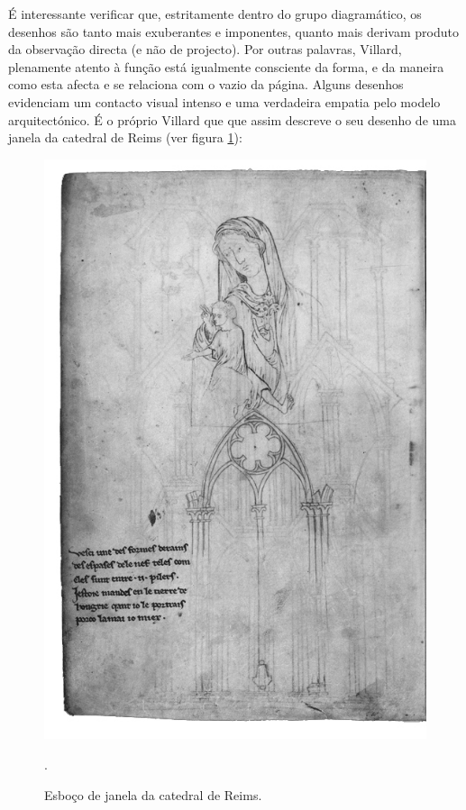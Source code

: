 \documentclass{article}
\begin{document}
É interessante verificar que, estritamente dentro do grupo
diagramático, os desenhos são tanto mais exuberantes e imponentes,
quanto mais derivam produto da observação directa (e não de
projecto). Por outras palavras, Villard, plenamente atento à função
está igualmente consciente da forma, e da maneira como esta afecta e
se relaciona com o vazio da página. Alguns desenhos evidenciam um
contacto visual intenso e uma verdadeira empatia pelo modelo
arquitectónico. É o próprio Villard que que assim descreve o seu
desenho de uma janela da catedral de Reims (ver figura \ref{fig:20}):

\begin{figure}
\centering\includegraphics[height=0.6\textheight,keepaspectratio]
                          {images/20.jpg}
  \caption{Esboço de janela da catedral de Reims.}.
  \label{fig:20}
\end{figure}
\end{document}
